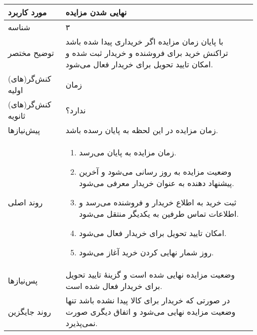 \documentclass{article}
\begin{document}
\begin{center}
\bgroup
\def\arraystretch{1.5}
\begin{tabular} {|p{}|p{}|}
\hline
 مورد کاربرد & 
نهایی شدن مزایده
\\ \hline
 شناسه &
۳
\\ \hline
توضیح مختصر &
با پایان زمان مزایده اگر خریداری پیدا شده باشد تراکنش خرید برای فروشنده و خریدار ثبت شده و امکان تایید تحویل برای خریدار فعال می‌شود.
\\ \hline
کنش‌گر(های) اولیه &
زمان
\\ \hline
کنش‌گر(های) ثانویه &
ندارد؟
\\ \hline
پیش‌نیازها &
زمان مزایده در این لحظه به پایان رسده باشد.
\\ \hline
روند اصلی &
\begin{enumerate}[nosep,topsep=0cm]
\item
زمان مزایده به پایان می‌رسد.
\item
وضعیت مزایده به روز رسانی می‌شود و آخرین پیشنهاد دهنده به عنوان خریدار معرفی می‌شود.
\item
ثبت خرید به اطلاع خریدار و فروشنده می‌رسد و اطلاعات تماس طرفین به یکدیگر منتقل می‌شود.
\item
امکان تایید تحویل برای خریدار فعال می‌شود.
\item
روز شمار نهایی کردن خرید آغاز می‌شود.
\end{enumerate}
\\ \hline
پس‌نیازها &
وضعیت مزایده نهایی شده است و گزینهٔ تایید تحویل برای خریدار فعال شده است.
\\ \hline
روند جایگزین &
در صورتی که خریدار برای کالا پیدا نشده باشد تنها وضعیت مزایده نهایی می‌شود و اتفاق دیگری صورت نمی‌پذیرد.
\\ \hline
\end{tabular}
\egroup
\end{center}

\newpage
\end{document}
